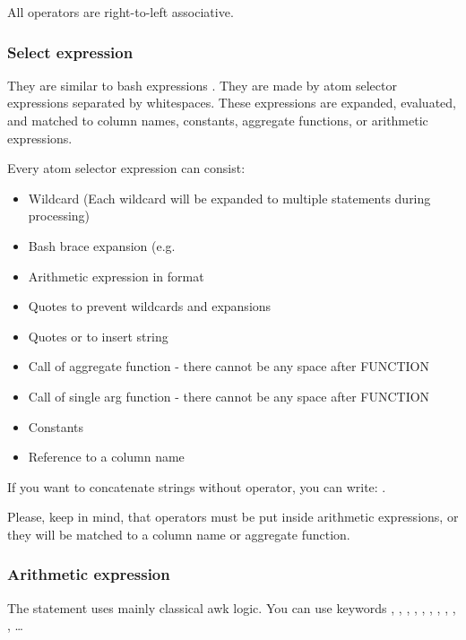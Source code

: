 All operators are right-to-left associative.

\subsubsection{Select expression}
They are similar to bash expressions \cite{bash-reference-manual}. They are made by atom selector expressions separated by whitespaces. These expressions are expanded, evaluated, and matched to column names, constants, aggregate functions, or arithmetic expressions.

Every atom selector expression can consist:
\begin{itemize}
    \item Wildcard (Each wildcard will be expanded to multiple statements during processing)
    \item Bash brace expansion (e.g.  \cite{bash-reference-manual}
    \item Arithmetic expression in  format
    \item Quotes  to prevent wildcards and expansions
    \item Quotes  or  to insert string
    \item Call of aggregate function  - there cannot be any space after FUNCTION
    \item Call of single arg function  - there cannot be any space after FUNCTION
    \item Constants
    \item Reference to a column name
\end{itemize}

If you want to concatenate strings without \icode{++} operator, you can write: \break{}.

Please, keep in mind, that operators must be put inside arithmetic expressions, or they will be matched to a column name or aggregate function.

\subsubsection{Arithmetic expression}
The statement uses mainly classical awk logic. \cite{awk-reference-manual} 
You can use keywords \icode{\textgreater}, \icode{\textless}, \icode{\textless=}, \icode{\textgreater=}, \icode{==}, \icode{$\vert\vert$}, \icode{\&\&}, \icode{+}, \icode{-}, \icode{*}, \icode{/}\ldots{}

